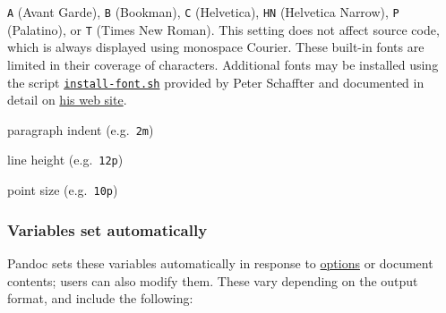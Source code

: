 \documentclass[
]{article}
\providecommand{\tightlist}{%
  \setlength{\itemsep}{0pt}\setlength{\parskip}{0pt}}
\begin{document}
\begin{description}
\tightlist
\item[\texttt{fontfamily}]
\texttt{A} (Avant Garde), \texttt{B} (Bookman), \texttt{C} (Helvetica),
\texttt{HN} (Helvetica Narrow), \texttt{P} (Palatino), or \texttt{T}
(Times New Roman). This setting does not affect source code, which is
always displayed using monospace Courier. These built-in fonts are
limited in their coverage of characters. Additional fonts may be
installed using the script
\href{https://www.schaffter.ca/mom/bin/install-font.sh}{\texttt{install-font.sh}}
provided by Peter Schaffter and documented in detail on
\href{https://www.schaffter.ca/mom/momdoc/appendices.html\#steps}{his
web site}.
\item[\texttt{indent}]
paragraph indent (e.g.~\texttt{2m})
\item[\texttt{lineheight}]
line height (e.g.~\texttt{12p})
\item[\texttt{pointsize}]
point size (e.g.~\texttt{10p})
\end{description}

\hypertarget{variables-set-automatically}{%
\subsubsection{Variables set
automatically}\label{variables-set-automatically}}

Pandoc sets these variables automatically in response to
\protect\hyperlink{options}{options} or document contents; users can
also modify them. These vary depending on the output format, and include
the following:
\end{document}
